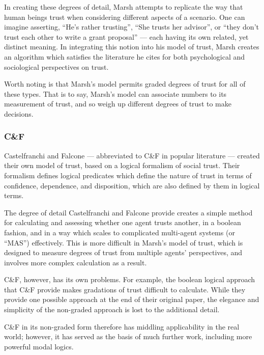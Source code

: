 In creating these degrees of detail, Marsh attempts to replicate the way that human beings trust when considering different aspects of a scenario. One can imagine asserting, ``He's rather trusting'', ``She trusts her advisor'', or ``they don't trust each other to write a grant proposal'' --- each having its own related, yet distinct meaning. In integrating this notion into his model of trust, Marsh creates an algorithm which satisfies the literature he cites for both psychological and sociological perspectives on trust.\par

Worth noting is that Marsh's model permits graded degrees of trust for all of these types. That is to say, Marsh's model can associate numbers to its measurement of trust, and so weigh up different degrees of trust to make decisions.\par

\subsubsection*{C\&F}\label{sec:cnf}
Castelfranchi and Falcone\cite{Castelfranchi2001} --- abbreviated to C\&F in popular literature --- created their own model of trust, based on a logical formalism of social trust. Their formalism defines logical predicates which define the nature of trust in terms of confidence, dependence, and disposition, which are also defined by them in logical terms.\par

The degree of detail Castelfranchi and Falcone provide creates a simple method for calculating and assessing whether one agent trusts another, in a boolean fashion, and in a way which scales to complicated multi-agent systems (or ``MAS'') effectively. This is more difficult in Marsh's model of trust, which is designed to measure degrees of trust from multiple agents' perspectives, and involves more complex calculation as a result.\par

C\&F, however, has its own problems. For example, the boolean logical approach that C\&F provide makes gradations of trust difficult to calculate. While they provide one possible approach at the end of their original paper, the elegance and simplicity of the non-graded approach is lost to the additional detail.\par

C\&F in its non-graded form therefore has middling applicability in the real world; however, it has served as the basis of much further work\cite{Herzig2009}, including more powerful modal logics.\cite{kramdi}\par

